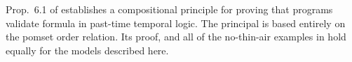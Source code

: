 Prop.~6.1 of \cite{DBLP:journals/pacmpl/JagadeesanJR20} establishes a
compositional principle for proving that programs validate formula in
past-time temporal logic.  The principal is based entirely on the pomset
order relation.  Its proof, and all of the no-thin-air examples in
\cite[]{DBLP:journals/pacmpl/JagadeesanJR20} hold equally for
the models described here.


